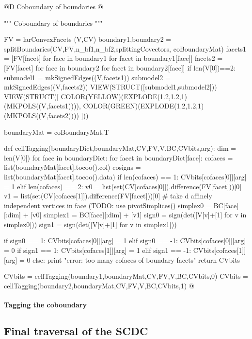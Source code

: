 \documentclass[11pt,oneside]{article}	%
\begin{document}
@D Coboundary of boundaries
@{""" Coboundary of boundaries """

FV = larConvexFacets (V,CV)
boundary1,boundary2 = splitBoundaries(CV,FV,n_bf1,n_bf2,splittingCovectors,
										coBoundaryMat)
facets1 = [FV[facet] for face in boundary1 for facet in boundary1[face]]
facets2 = [FV[facet] for face in boundary2 for facet in boundary2[face]]
if len(V[0])==2:
    submodel1 = mkSignedEdges((V,facets1))
    submodel2 = mkSignedEdges((V,facets2))
    VIEW(STRUCT([submodel1,submodel2]))
    VIEW(STRUCT([ COLOR(YELLOW)(EXPLODE(1.2,1.2,1)(MKPOLS((V,facets1)))), 
    		COLOR(GREEN)(EXPLODE(1.2,1.2,1)(MKPOLS((V,facets2)))) ]))
		
boundaryMat = coBoundaryMat.T

def cellTagging(boundaryDict,boundaryMat,CV,FV,V,BC,CVbits,arg):
	dim = len(V[0])
	for face in boundaryDict:
		for facet in boundaryDict[face]:
			cofaces = list(boundaryMat[facet].tocoo().col)
			cosigns = list(boundaryMat[facet].tocoo().data)
			if len(cofaces) == 1: 
				CVbits[cofaces[0]][arg] = 1
			elif len(cofaces) == 2:
				v0 = list(set(CV[cofaces[0]]).difference(FV[facet]))[0]
				v1 = list(set(CV[cofaces[1]]).difference(FV[facet]))[0]
				# take d affinely independent vertices in face (TODO: use pivotSimplices() 
				simplex0 = BC[face][:dim] + [v0]
				simplex1 = BC[face][:dim] + [v1]
				sign0 = sign(det([V[v]+[1] for v in simplex0]))
				sign1 = sign(det([V[v]+[1] for v in simplex1]))
				
				if sign0 == 1: CVbits[cofaces[0]][arg] = 1
				elif sign0 == -1: CVbits[cofaces[0]][arg] = 0
				if sign1 == 1: CVbits[cofaces[1]][arg] = 1
				elif sign1 == -1: CVbits[cofaces[1]][arg] = 0
			else: 
				print "error: too many cofaces of boundary facets"
	return CVbits
	
CVbits = cellTagging(boundary1,boundaryMat,CV,FV,V,BC,CVbits,0)
CVbits = cellTagging(boundary2,boundaryMat,CV,FV,V,BC,CVbits,1)
@}




\paragraph{Tagging the coboundary}


\subsection{Final traversal of the SCDC}
\label{sec:traversal}
\end{document}
